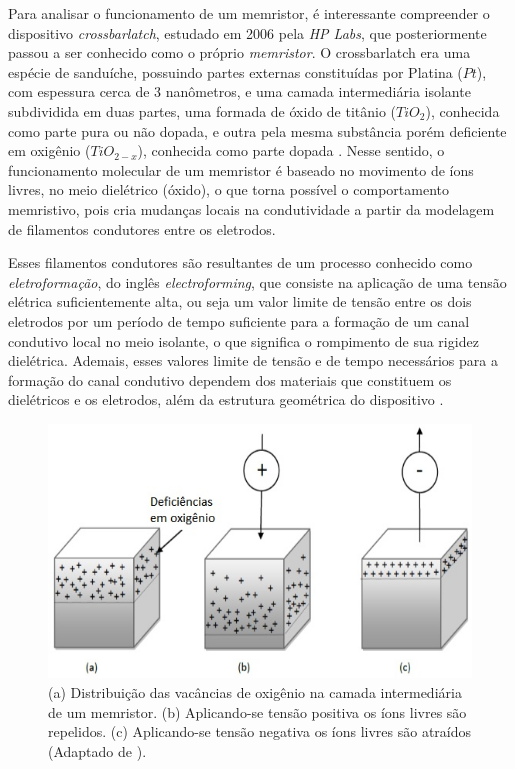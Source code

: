 \documentclass{ceel}
\begin{document}
\begin{multicols}{2}
Para analisar o funcionamento de um memristor, é interessante compreender o dispositivo \emph{crossbarlatch}, estudado em 2006 pela
\emph{HP Labs}, que posteriormente passou a ser conhecido como o próprio \emph{memristor}. O crossbarlatch era uma espécie de sanduíche, possuindo partes externas constituídas por Platina ($Pt$), com espessura cerca de 3 nanômetros, e uma camada intermediária isolante subdividida em duas partes, uma formada de óxido de titânio ($TiO_2$), conhecida como parte pura ou não dopada, e outra pela mesma substância porém deficiente em oxigênio ($TiO_{2-x}$), conhecida como parte dopada \cite{construcao}.  Nesse sentido, o funcionamento molecular de um memristor é baseado no movimento de íons livres, no meio dielétrico (óxido), o que torna possível o comportamento memristivo, pois cria mudanças locais na condutividade a partir da modelagem de filamentos condutores entre os eletrodos.

Esses filamentos condutores são resultantes de um processo conhecido como \emph{eletroformação}, do inglês \emph{electroforming}, que consiste na aplicação de uma tensão elétrica suficientemente alta, ou seja um valor limite de tensão entre os dois eletrodos por um período de tempo suficiente para a formação de um canal condutivo local no meio isolante, o que significa o rompimento de sua rigidez dielétrica.
Ademais, esses valores limite de tensão e de tempo necessários para a formação do canal condutivo dependem dos materiais que constituem os dielétricos e os eletrodos, além da estrutura geométrica do dispositivo \cite{us}. 

\vspace{-0.25cm}
\begin{figure}[H]
\centering
\includegraphics[width=\columnwidth]{modificado}
\caption{(a) Distribuição das vacâncias de oxigênio na camada intermediária de um memristor. (b) Aplicando-se tensão positiva os íons livres são repelidos. (c) Aplicando-se tensão negativa os íons livres são atraídos (Adaptado de \cite{study}).}\label{estrutura}
\end{figure}
\vspace{0.01cm}


\end{multicols}
\end{document}
